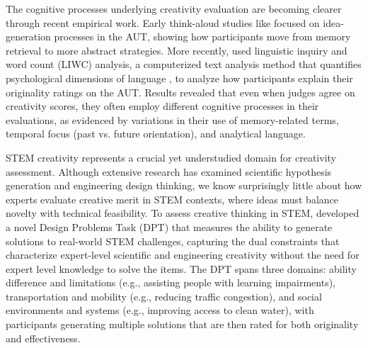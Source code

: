 
The cognitive processes underlying creativity evaluation are becoming clearer through recent empirical work. Early think-aloud studies like \citet{gilhooly2007divergent} focused on idea-generation processes in the AUT, showing how participants move from memory retrieval to more abstract strategies. More recently, \citet{orwig2024creative} used linguistic inquiry and word count (LIWC) analysis, a computerized text analysis method that quantifies psychological dimensions of language \citep{tausczik2010psychological}, to analyze how participants explain their originality ratings on the AUT. Results revealed that even when judges agree on creativity scores, they often employ different cognitive processes in their evaluations, as evidenced by variations in their use of memory-related terms, temporal focus (past vs. future orientation), and analytical language.

STEM creativity represents a crucial yet understudied domain for creativity assessment. Although extensive research has examined scientific hypothesis generation and engineering design thinking, we know surprisingly little about how experts evaluate creative merit in STEM contexts, where ideas must balance novelty with technical feasibility. To assess creative thinking in STEM, \citet{Patterson2025} developed a novel Design Problems Task (DPT) that measures the ability to generate solutions to real-world STEM challenges, capturing the dual constraints that characterize expert-level scientific and engineering creativity without the need for expert level knowledge to solve the items. The DPT spans three domains: ability difference and limitations (e.g., assisting people with learning impairments), transportation and mobility (e.g., reducing traffic congestion), and social environments and systems (e.g., improving access to clean water), with participants generating multiple solutions that are then rated for both originality and effectiveness.

